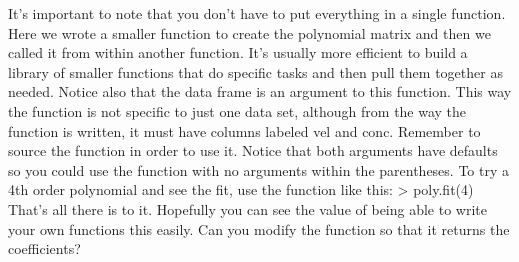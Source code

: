 It's important to note that you don't have to put everything in a single function. Here we wrote a smaller function to create the polynomial matrix and then we called it from within another function. It's usually more efficient to build a library of smaller functions that do specific tasks and then pull them together as needed. Notice also that the data frame is an argument to this function. This way the function is not specific to just one data set, although from the way the function is written, it must have columns labeled vel and conc. 
Remember to source the function in order to use it. Notice that both arguments have defaults so you could use the function with no arguments within the parentheses. To try a 4th order polynomial and see the fit, use the function like this: 
> poly.fit(4)
That's all there is to it. Hopefully you can see the value of being able to write your own functions this easily. Can you modify the function so that it returns the coefficients? 

